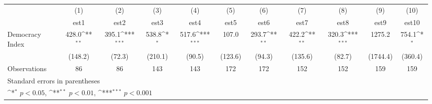 {
\def\sym#1{\ifmmode^{#1}\else\(^{#1}\)\fi}
\begin{tabular}{l*{10}{c}}
\hline\hline
                    &\multicolumn{1}{c}{(1)}         &\multicolumn{1}{c}{(2)}         &\multicolumn{1}{c}{(3)}         &\multicolumn{1}{c}{(4)}         &\multicolumn{1}{c}{(5)}         &\multicolumn{1}{c}{(6)}         &\multicolumn{1}{c}{(7)}         &\multicolumn{1}{c}{(8)}         &\multicolumn{1}{c}{(9)}         &\multicolumn{1}{c}{(10)}         \\
                    &        est1         &        est2         &        est3         &        est4         &        est5         &        est6         &        est7         &        est8         &        est9         &       est10         \\
\hline
Democracy Index     &       428.0\sym{**} &       395.1\sym{***}&       538.8\sym{*}  &       517.6\sym{***}&       107.0         &       293.7\sym{**} &       422.2\sym{**} &       320.3\sym{***}&      1275.2         &       754.1\sym{*}  \\
                    &     (148.2)         &      (72.3)         &     (210.1)         &      (90.5)         &     (123.6)         &      (94.3)         &     (135.6)         &      (82.7)         &    (1744.4)         &     (360.4)         \\
\hline
Observations        &          86         &          86         &         143         &         143         &         172         &         172         &         152         &         152         &         159         &         159         \\
\hline\hline
\multicolumn{11}{l}{\footnotesize Standard errors in parentheses}\\
\multicolumn{11}{l}{\footnotesize \sym{*} \(p<0.05\), \sym{**} \(p<0.01\), \sym{***} \(p<0.001\)}\\
\end{tabular}
}
